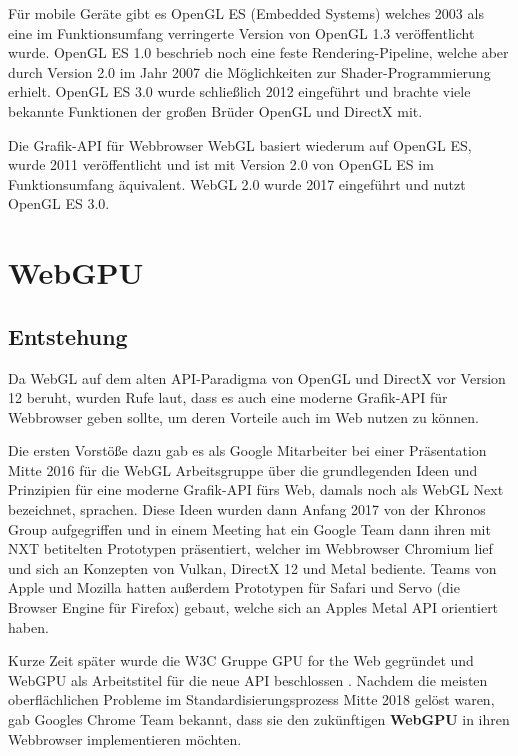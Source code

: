 \documentclass[oneside]{ausarbeitung}
\newcommand*{\quotize}[1]{\glqq #1\grqq}
\begin{document}
Für mobile Geräte gibt es OpenGL ES (\quotize{Embedded Systems}) welches 2003 als eine im Funktionsumfang verringerte Version von OpenGL 1.3 veröffentlicht wurde. OpenGL ES 1.0 beschrieb noch eine feste Rendering-Pipeline, welche aber durch Version 2.0 im Jahr 2007 die Möglichkeiten zur Shader-Programmierung erhielt. OpenGL ES 3.0 wurde schließlich 2012 eingeführt und brachte viele bekannte Funktionen der \quotize{großen Brüder} OpenGL und DirectX mit.

Die Grafik-API für Webbrowser WebGL basiert wiederum auf OpenGL ES, wurde 2011 veröffentlicht und ist mit Version 2.0 von OpenGL ES im Funktionsumfang äquivalent. WebGL 2.0 wurde 2017 eingeführt und nutzt OpenGL ES 3.0.


\chapter{WebGPU}
\label{cha:webgpu}

\section{Entstehung \cite[Vgl.][]{wikipedia:webgpu}}
Da WebGL auf dem alten API-Paradigma von OpenGL und DirectX vor Version 12 beruht, wurden Rufe laut, dass es auch eine \quotize{moderne} Grafik-API für Webbrowser geben sollte, um deren Vorteile auch im Web nutzen zu können.

Die ersten Vorstöße dazu gab es als Google Mitarbeiter bei einer Präsentation Mitte 2016 für die WebGL Arbeitsgruppe über die grundlegenden Ideen und Prinzipien für eine moderne Grafik-API fürs Web, damals noch als \quotize{WebGL Next} bezeichnet, sprachen. Diese Ideen wurden dann Anfang 2017 von der Khronos Group aufgegriffen und in einem Meeting hat ein Google Team dann ihren mit \quotize{NXT} betitelten Prototypen präsentiert, welcher im Webbrowser Chromium lief und sich an Konzepten von Vulkan, DirectX 12 und Metal bediente. Teams von Apple und Mozilla hatten außerdem Prototypen für Safari und Servo (die Browser Engine für Firefox) gebaut, welche sich an Apples Metal API orientiert haben. 

Kurze Zeit später wurde die W3C Gruppe \quotize{GPU for the Web} gegründet und \quotize{WebGPU} als Arbeitstitel für die neue API beschlossen \cite{golem:webgpu}. Nachdem die meisten oberflächlichen Probleme im Standardisierungsprozess Mitte 2018 gelöst waren, gab Googles Chrome Team bekannt, dass sie den zukünftigen \textbf{WebGPU} in ihren Webbrowser implementieren möchten.
\end{document}
